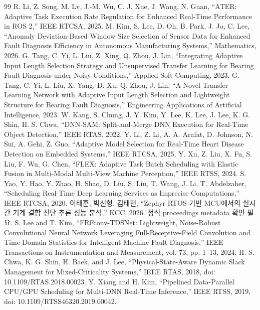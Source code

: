 \documentclass[10pt]{article}
\begin{document}
\begin{thebibliography}{99}
 R. Li, Z. Song, M. Lv, J.-M. Wu, C. J. Xue, J. Wang, N. Guan, ``ATER: Adaptive Task Execution Rate Regulation for Enhanced Real-Time Performance in ROS 2,'' IEEE RTCSA, 2025.
 M. Kim, S. Lee, D. Oh, B. Park, J. Jo, C. Lee, ``Anomaly Deviation-Based Window Size Selection of Sensor Data for Enhanced Fault Diagnosis Efficiency in Autonomous Manufacturing Systems,'' Mathematics, 2026.
 G. Tang, C. Yi, L. Liu, Z. Xing, Q. Zhou, J. Lin, ``Integrating Adaptive Input Length Selection Strategy and Unsupervised Transfer Learning for Bearing Fault Diagnosis under Noisy Conditions,'' Applied Soft Computing, 2023.
 G. Tang, C. Yi, L. Liu, X. Yang, D. Xu, Q. Zhou, J. Lin, ``A Novel Transfer Learning Network with Adaptive Input Length Selection and Lightweight Structure for Bearing Fault Diagnosis,'' Engineering Applications of Artificial Intelligence, 2023.
 W. Kang, S. Chung, J. Y. Kim, Y. Lee, K. Lee, J. Lee, K. G. Shin, H. S. Chwa, ``DNN-SAM: Split-and-Merge DNN Execution for Real-Time Object Detection,'' IEEE RTAS, 2022.
 Y. Li, Z. Li, A. A. Arafat, D. Johnson, N. Sui, A. Gehi, Z. Guo, ``Adaptive Model Selection for Real-Time Heart Disease Detection on Embedded Systems,'' IEEE RTCSA, 2025.
 Y. Xu, Z. Liu, X. Fu, S. Liu, F. Wu, G. Chen, ``FLEX: Adaptive Task Batch Scheduling with Elastic Fusion in Multi-Modal Multi-View Machine Perception,'' IEEE RTSS, 2024.
 S. Yao, Y. Hao, Y. Zhao, H. Shao, D. Liu, S. Liu, T. Wang, J. Li, T. Abdelzaher, ``Scheduling Real-Time Deep Learning Services as Imprecise Computations,'' IEEE RTCSA, 2020.
 이태훈, 박신형, 김태현, ``Zephyr RTOS 기반 MCU에서의 실시간 기계 결함 진단 추론 성능 분석,'' KCC, 2026. 정식 proceedings metadata 확인 필요.
 S. Lee and T. Kim, ``FRFconv-TDSNet: Lightweight, Noise-Robust Convolutional Neural Network Leveraging Full-Receptive-Field Convolution and Time-Domain Statistics for Intelligent Machine Fault Diagnosis,'' IEEE Transactions on Instrumentation and Measurement, vol. 73, pp. 1--13, 2024.
 H. S. Chwa, K. G. Shin, H. Baek, and J. Lee, ``Physical-State-Aware Dynamic Slack Management for Mixed-Criticality Systems,'' IEEE RTAS, 2018, doi: 10.1109/RTAS.2018.00023.
 Y. Xiang and H. Kim, ``Pipelined Data-Parallel CPU/GPU Scheduling for Multi-DNN Real-Time Inference,'' IEEE RTSS, 2019, doi: 10.1109/RTSS46320.2019.00042.
\end{thebibliography}
\end{document}
